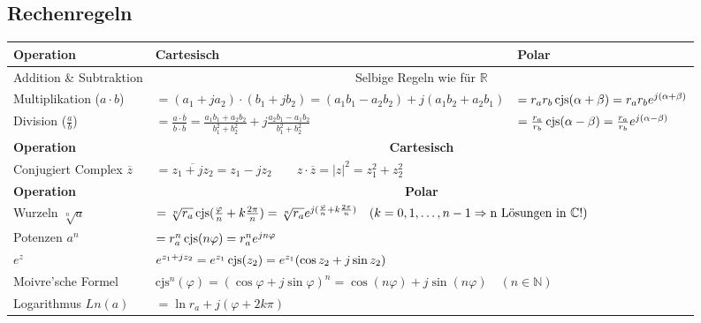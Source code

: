 \subsection{Rechenregeln}
\begin{center}
\begin{tabular}{|l|l|l|}
	\hline
	\textbf{Operation} & \textbf{Cartesisch} & \textbf{Polar} \\
	\hline
	
	Addition \& Subtraktion & 
	\multicolumn{2}{|c|}{Selbige Regeln wie für
	$\mathbb{R}$}\\
	\hline
	
	Multiplikation ($a \cdot b$) &
	$ = (a_1 + j a_2) \cdot (b_1 + j b_2) = (a_1 b_1 - a_2 b_2) + j(a_1 b_2 + a_2
	b_1) $ &
	$ = r_a r_b \operatorname{cjs}(\alpha + \beta) = r_a r_b e^{j(\alpha +
	\beta)}$\\
	\hline 
	
	Division ($\frac{a}{b}$) &
	$ = \frac{a \cdot \overline{b}}{b \cdot \overline{b}}
	  = \frac{a_1 b_1 + a_2 b_2}{b_1^2 + b_2^2} + j \frac{a_2 b_1 - a_1
	  b_2}{b_1^2 + b_2^2}$ & 
	$ = \frac{r_a}{r_b} \operatorname{cjs}(\alpha - \beta) 
	  = \frac{r_a}{r_b} e^{j(\alpha - \beta)}$ \\
	\hline
	\hline
	
	\textbf{Operation} & \multicolumn{2}{|c|}{
		\textbf{Cartesisch}
	} \\
	
	\hline
	Conjugiert Complex $\overline{z}$ &
	\multicolumn{2}{|l|}{
		$ = \overline{z_1 + jz_2} = z_1 - jz_2 \qquad
		  z \cdot \overline{z} = |z|^2 = z_1^2 + z_2^2$
	} \\
	\hline
	\hline
	
	\textbf{Operation} & \multicolumn{2}{|c|}{
		\textbf{Polar}
	} \\
	
	\hline
	Wurzeln $\sqrt[n]{a}$ &
	\multicolumn{2}{|l|}{
		$ = \sqrt[n]{r_a} \operatorname{cjs}(\frac{\varphi}{n}+k\frac{2\pi}{n}) 
		  = \sqrt[n]{r_a} e^{j(\frac{\varphi}{n} + k \frac{2\pi}{n})} \quad 
		  (k = 0, 1, \ldots, n-1 \Rightarrow \text{n Lösungen in } \mathbb{C} !)
		$
	} \\
	\hline
	
	Potenzen $a^n$ &
	\multicolumn{2}{|l|}{
		$ = r_a^n \operatorname{cjs}(n\varphi) 
		  = r_a^n e^{jn\varphi}
		$
	} \\
	\hline
	
	$e^z$ &
	\multicolumn{2}{|l|}{
		$ e^{z_1+jz_2} 
		  = e^{z_1} \operatorname{cjs}(z_2) 
		  = e^{z_1} (\cos{z_2} + j\sin{z_2})
		$
	} \\
	\hline
	
	Moivre'sche Formel &
	\multicolumn{2}{|l|}{
		$ \text{cjs}^n(\varphi) 
		  = (\cos{\varphi} + j\sin{\varphi})^n 
		  = \cos(n\varphi) +j\sin(n\varphi) \quad (n \in \mathbb{N})
		$
	} \\
	\hline
	
	Logarithmus $Ln(a)$ &
	\multicolumn{2}{|l|}{
		$ = \ln{r_a} + j (\varphi + 2k \pi)$
	} \\
	\hline
\end{tabular}
\end{center}

